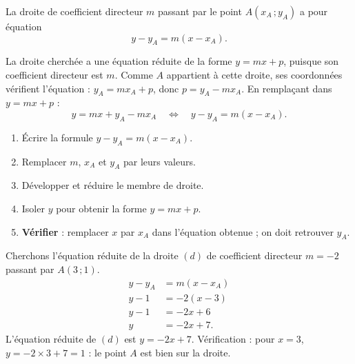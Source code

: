 \documentclass[11pt]{article}
\begin{document}
\begin{propriete}
La droite de coefficient directeur $m$ passant par le point $A(x_A\,; y_A)$ a pour équation
\[ y - y_A = m(x - x_A). \]
\end{propriete}

\begin{experience}[Démonstration]
La droite cherchée a une équation réduite de la forme $y = mx + p$, puisque son coefficient directeur est $m$. Comme $A$ appartient à cette droite, ses coordonnées vérifient l'équation : $y_A = m x_A + p$, donc $p = y_A - m x_A$. En remplaçant dans $y = mx + p$ :
\[ y = mx + y_A - m x_A \quad \Longleftrightarrow \quad y - y_A = m(x - x_A). \]
\end{experience}

\begin{methode}
\begin{enumerate}
\item Écrire la formule $y - y_A = m(x - x_A)$.
\item Remplacer $m$, $x_A$ et $y_A$ par leurs valeurs.
\item Développer et réduire le membre de droite.
\item Isoler $y$ pour obtenir la forme $y = mx + p$.
\item \textbf{Vérifier} : remplacer $x$ par $x_A$ dans l'équation obtenue ; on doit retrouver $y_A$.
\end{enumerate}
\end{methode}

\begin{exemplebox}
Cherchons l'équation réduite de la droite $(d)$ de coefficient directeur $m = -2$ passant par $A(3\,; 1)$.
\begin{align*}
y - y_A &= m(x - x_A) \\
y - 1 &= -2(x - 3) \\
y - 1 &= -2x + 6 \\
y &= -2x + 7.
\end{align*}
L'équation réduite de $(d)$ est $y = -2x + 7$. Vérification : pour $x = 3$, $y = -2 \times 3 + 7 = 1$ : le point $A$ est bien sur la droite.
\end{exemplebox}
\end{document}
